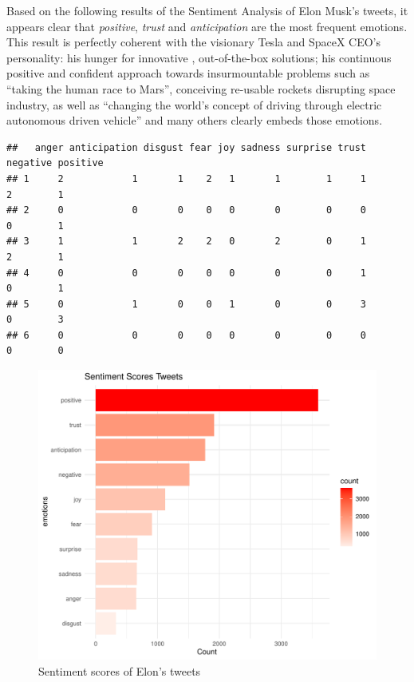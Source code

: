 \documentclass[
]{article}
\begin{document}
Based on the following results of the Sentiment Analysis of Elon Musk's
tweets, it appears clear that \emph{positive}, \emph{trust} and
\emph{anticipation} are the most frequent emotions. This result is
perfectly coherent with the visionary Tesla and SpaceX CEO's
personality: his hunger for innovative , out-of-the-box solutions; his
continuous positive and confident approach towards insurmountable
problems such as ``taking the human race to Mars'', conceiving re-usable
rockets disrupting space industry, as well as ``changing the world's
concept of driving through electric autonomous driven vehicle'' and many
others clearly embeds those emotions.

\begin{verbatim}
##   anger anticipation disgust fear joy sadness surprise trust negative positive
## 1     2            1       1    2   1       1        1     1        2        1
## 2     0            0       0    0   0       0        0     0        0        1
## 3     1            1       2    2   0       2        0     1        2        1
## 4     0            0       0    0   0       0        0     1        0        1
## 5     0            1       0    0   1       0        0     3        0        3
## 6     0            0       0    0   0       0        0     0        0        0
\end{verbatim}

\begin{figure}
\centering
\includegraphics{Trial1_files/figure-latex/fig6-1.pdf}
\caption{\label{fig:fig6}Sentiment scores of Elon's tweets}
\end{figure}
\end{document}
